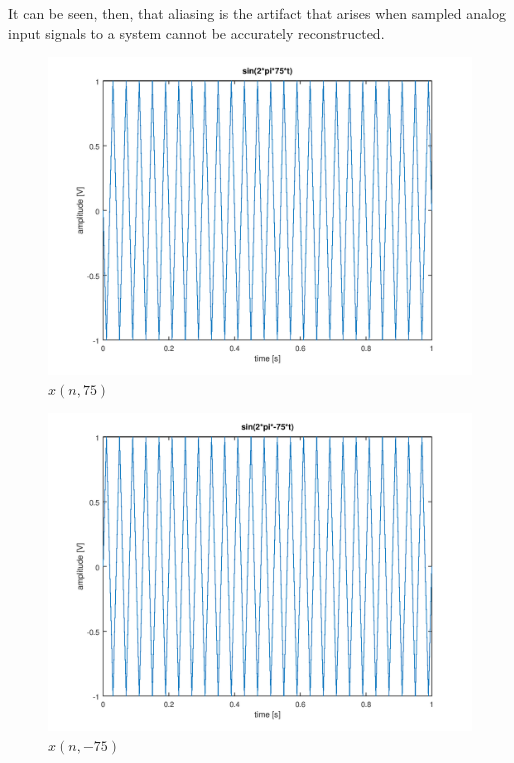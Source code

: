\documentclass[a4paper, 12pt]{report}
\begin{document}
			It can be seen, then, that aliasing is the artifact that arises when sampled analog input signals to a system cannot be accurately reconstructed.

			\begin{figure}[H]
				\includegraphics[width=\textwidth]{img/1_16.png}
				\caption{$x(n, 75)$}
				\label{fig:16}
			\end{figure}

			\begin{figure}[H]
				\includegraphics[width=\textwidth]{img/1_17.png}
				\caption{$x(n, -75)$}
				\label{fig:17}
			\end{figure}
\end{document}
